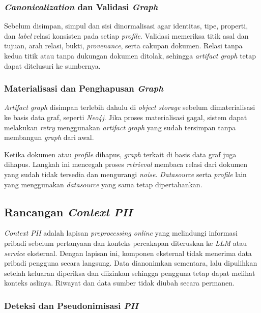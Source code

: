 \subsubsection{\emph{Canonicalization} dan Validasi \emph{Graph}}
\label{subsubsec:canonicalization-graph}

Sebelum disimpan, simpul dan sisi dinormalisasi agar identitas, tipe, properti, dan \emph{label}
relasi konsisten pada setiap \emph{profile}. Validasi memeriksa titik asal dan tujuan, arah relasi,
bukti, \emph{provenance}, serta cakupan dokumen. Relasi tanpa kedua titik atau tanpa dukungan
dokumen ditolak, sehingga \emph{artifact graph} tetap dapat ditelusuri ke sumbernya.

\subsubsection{Materialisasi dan Penghapusan \emph{Graph}}
\label{subsubsec:materialisasi-graph}

\emph{Artifact graph} disimpan terlebih dahulu di \emph{object storage} sebelum
dimaterialisasi ke basis data graf, seperti \emph{Neo4j}. Jika proses materialisasi gagal,
sistem dapat melakukan \emph{retry} menggunakan \emph{artifact graph} yang sudah tersimpan
tanpa membangun \emph{graph} dari awal.

Ketika dokumen atau \emph{profile} dihapus, \emph{graph} terkait di basis data graf juga
dihapus. Langkah ini mencegah proses \emph{retrieval} membaca relasi dari dokumen yang sudah
tidak tersedia dan mengurangi \emph{noise}. \emph{Datasource} serta \emph{profile} lain yang
menggunakan \emph{datasource} yang sama tetap dipertahankan.

\subsection{Rancangan \emph{Context PII}}
\label{subsec:solusi-context-pii}

\emph{Context PII} adalah lapisan \emph{preprocessing online} yang melindungi informasi
pribadi sebelum pertanyaan dan konteks percakapan diteruskan ke \emph{LLM} atau \emph{service} eksternal.
Dengan lapisan ini, komponen eksternal tidak menerima data pribadi pengguna secara langsung.
Data dianonimkan sementara, lalu dipulihkan setelah keluaran diperiksa dan diizinkan sehingga
pengguna tetap dapat melihat konteks aslinya. Riwayat dan data sumber tidak diubah secara
permanen.

\subsubsection{Deteksi dan Pseudonimisasi \emph{PII}}
\label{subsubsec:deteksi-pseudonimisasi}

